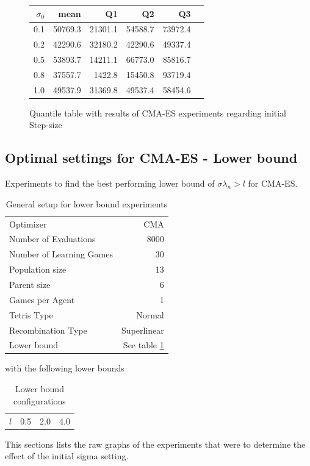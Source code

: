 \begin{figure}[H]
\centering
\begin{tabular}{r | r r r r r}
$\sigma_0$ & mean & Q1 & Q2 & Q3\\
\hline
0.1 & 50769.3 & 21301.1 & 54588.7 & 73972.4\\
0.2 & 42290.6 & 32180.2 & 42290.6 & 49337.4\\
0.5 & 53893.7 & 14211.1 & 66773.0 & 85816.7\\
0.8 & 37557.7 & 1422.8  & 15450.8 & 93719.4\\
1.0 & 49537.9 & 31369.8 & 49537.4 & 58454.6
\end{tabular}
\caption{Quantile table with results of CMA-ES experiments regarding initial Step-size \label{CMAInitialSigmaConfigTestAppendix}}
\end{figure}


\clearpage

\subsection{Optimal settings for CMA-ES - Lower bound \label{appendixCMALowerBound}}
Experiments to find the best performing lower bound of $\sigma \lambda_n > l$ for CMA-ES.

\begin{table}[h]
\centering
\begin{tabular}{l r}
Optimizer & CMA\\
Number of Evaluations & 8000\\
Number of Learning Games &30\\
Population size& 13\\
Parent size & 6\\
Games per Agent & 1\\
Tetris Type & Normal\\
\hline
Recombination Type & Superlinear\\
Lower bound & See table \ref{appendixLowerBound}
\end{tabular}
\caption{General setup for lower bound experiments}
\end{table}

with the following lower bounds

\begin{table}[H]
\centering
\begin{tabular}{c | c c c}
$l$ & 0.5 & 2.0 & 4.0
\end{tabular}
\caption{Lower bound configurations \label{appendixLowerBound}}
\end{table}
This sections lists the raw graphs of the experiments that were
to determine the effect of the initial sigma setting. 


